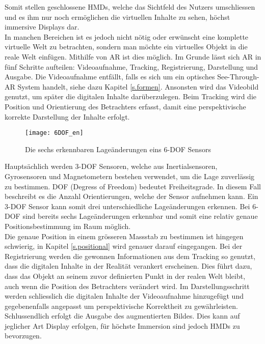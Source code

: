 Somit stellen geschlossene HMDs, welche das Sichtfeld des Nutzers umschliessen und es ihm nur noch ermöglichen die virtuellen Inhalte zu sehen, höchst immersive Displays dar.\cite[S.~12~ff.]{doerner13}\\[6pt]
In manchen Bereichen ist es jedoch nicht nötig oder erwünscht eine komplette virtuelle Welt zu betrachten, sondern man möchte ein virtuelles Objekt in die reale Welt einfügen. Mithilfe von AR ist dies möglich. Im Grunde lässt sich AR in fünf Schritte aufteilen: Videoaufnahme, Tracking, Registrierung, Darstellung und Ausgabe. Die Videoaufnahme entfällt, falls es sich um ein optisches See-Through-AR System handelt, siehe dazu Kapitel \ref{s.formen}. Ansonsten wird das Videobild genutzt, um später die digitalen Inhalte darüberzulegen. Beim Tracking wird die Position und Orientierung des Betrachters erfasst, damit eine perspektivische korrekte Darstellung der Inhalte erfolgt.\\
\newpage
\begin{wrapfigure}{r}{0.5\textwidth}
	\vspace{-25pt}
	\begin{center}
		\texttt{[image: 6DOF\_en]}
	\end{center}
	\vspace{-15pt}
	\captionsetup{width=0.42\textwidth}
	\caption{Die sechs erkennbaren Lageänderungen eins 6-DOF Sensors}\label{dof}
	\vspace{-10pt}
\end{wrapfigure}
 Hauptsächlich werden 3-DOF Sensoren, welche aus Inertialsensoren, Gyrosensoren und Magnetometern bestehen verwendet, um die Lage zuverlässig zu bestimmen. DOF (Degress of Freedom) bedeutet Freiheitsgrade. In diesem Fall beschreibt es die Anzahl Orientierungen, welche der Sensor aufnehmen kann. Ein 3-DOF Sensor kann somit drei unterschiedliche Lageänderungen erkennen. Bei 6-DOF sind bereits sechs Lageänderungen erkennbar und somit eine relativ genaue Positionsbestimmung im Raum möglich.\cite{website:dof}\\[6pt]
  Die genaue Position in einem grösseren Massstab zu bestimmen ist hingegen schwierig, in Kapitel \ref{s.positional} wird genauer darauf eingegangen. Bei der Registrierung werden die gewonnen Informationen aus dem Tracking so genutzt, dass die digitalen Inhalte in der Realität verankert erscheinen. Dies führt dazu, dass das Objekt an seinem zuvor definierten Punkt in der realen Welt bleibt, auch wenn die Position des Betrachters verändert wird. Im Darstellungsschritt werden schliesslich die digitalen Inhalte der Videoaufnahme hinzugefügt und gegebenenfalls angepasst um perspektivische Korrektheit zu gewährleisten. Schlussendlich erfolgt die Ausgabe des augmentierten Bildes. Dies kann auf jeglicher Art Display erfolgen, für höchste Immersion sind jedoch HMDs zu bevorzugen.\cite[S.~241~ff.]{doerner13}

